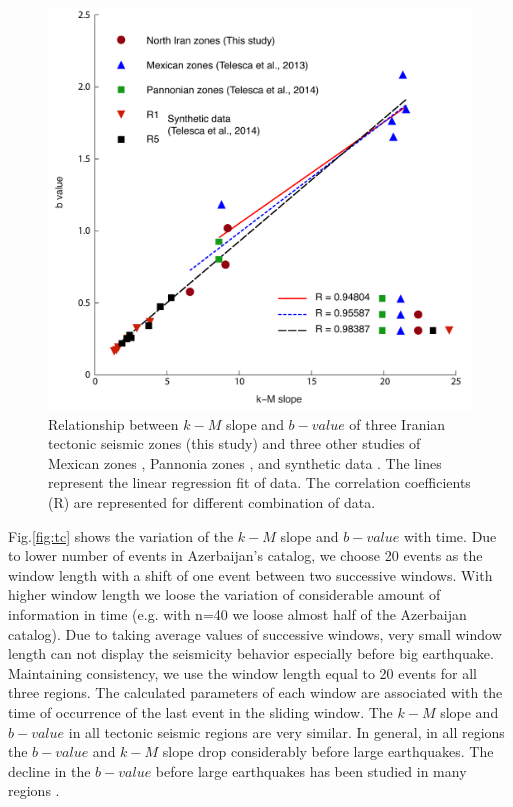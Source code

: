 \begin{figure}[t]
	\centering
	\includegraphics[scale=0.6]{figures/pdf/Figure09.pdf} 
	\caption{ Relationship between $k-M$ slope and $b-value$ of three Iranian tectonic seismic zones (this study) and three other studies of Mexican zones \citep{Telesca2013}, Pannonia zones \citep{Telesca2014}, and synthetic data \citep{Telesca2014-pone}. The lines represent the linear regression fit of data. The correlation coefficients (R) are represented for different combination of data.}
	\label{fig:regression}
\end{figure}

Fig.\ref{fig:tc} shows the variation of the  $k-M$  slope and  $b-value$  with time. Due to lower number of events in Azerbaijan's catalog, we choose 20 events as the window length with a shift of one event between two successive windows. With higher window length we loose the variation of considerable amount of information in time (e.g. with n=40 we loose almost half of the Azerbaijan catalog). Due to taking average values of successive windows, very small window length can not display the seismicity behavior especially before big earthquake. Maintaining consistency, we use the window length equal to 20 events for all three regions. The calculated parameters of each window are associated with the time of occurrence of the last event in the sliding window. The  $k-M$  slope and  $b-value$  in all tectonic seismic regions are very similar. In general, in all regions the $b-value$  and  $k-M$  slope drop considerably before large earthquakes. The decline in the  $b-value$  before large earthquakes has been studied in many regions \citep{Wyss2000, Wyss2006, Schorlemmer2005, Chan2012}.

